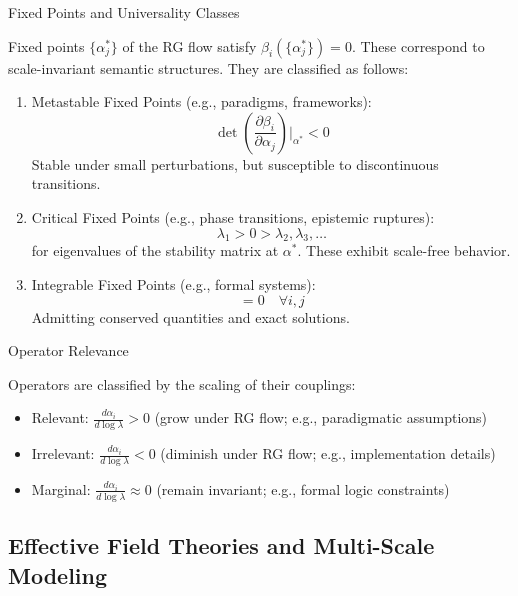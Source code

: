 Fixed Points and Universality Classes

Fixed points \(\{\alpha_j^*\}\) of the RG flow satisfy \(\beta_i(\{\alpha_j^*\}) = 0\). These correspond to scale-invariant semantic structures. They are classified as follows:

\begin{enumerate}
    \item Metastable Fixed Points (e.g., paradigms, frameworks):
    \begin{equation}
    \det\left(\frac{\partial \beta_i}{\partial \alpha_j}\right)\bigg|_{\alpha^*} < 0
    \end{equation}
    Stable under small perturbations, but susceptible to discontinuous transitions.

    \item Critical Fixed Points (e.g., phase transitions, epistemic ruptures):
    \begin{equation}
    \lambda_1 > 0 > \lambda_2, \lambda_3, \ldots
    \end{equation}
    for eigenvalues of the stability matrix at \(\alpha^*\). These exhibit scale-free behavior.

    \item Integrable Fixed Points (e.g., formal systems):
    \begin{equation}
    [\beta_i, \beta_j] = 0 \quad \forall i, j
    \end{equation}
    Admitting conserved quantities and exact solutions.
\end{enumerate}

Operator Relevance

Operators are classified by the scaling of their couplings:

\begin{itemize}
    \item Relevant: \(\frac{d\alpha_i}{d\log\lambda} > 0\) (grow under RG flow; e.g., paradigmatic assumptions)
    \item Irrelevant: \(\frac{d\alpha_i}{d\log\lambda} < 0\) (diminish under RG flow; e.g., implementation details)
    \item Marginal: \(\frac{d\alpha_i}{d\log\lambda} \approx 0\) (remain invariant; e.g., formal logic constraints)
\end{itemize}

\subsection{Effective Field Theories and Multi-Scale Modeling}

